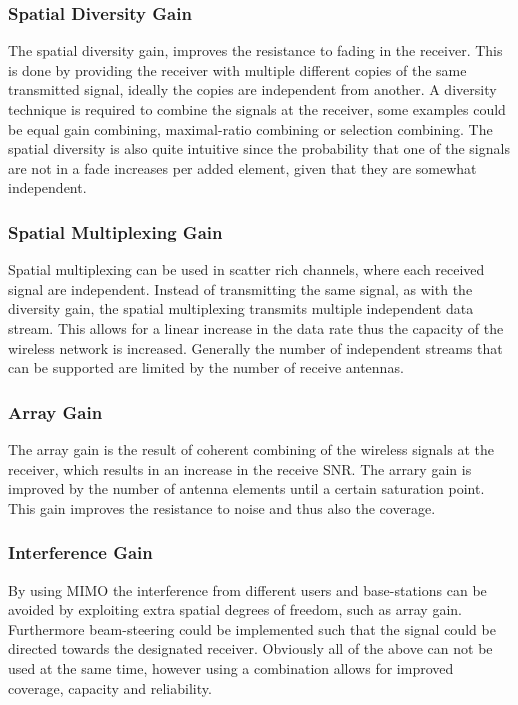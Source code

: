 \subsubsection{Spatial Diversity Gain}
The spatial diversity gain, improves the resistance to fading in the receiver. This is done by providing the receiver with multiple different copies of the same transmitted signal, ideally the copies are independent from another. A diversity technique is required to combine the signals at the receiver\cite{Ezio2007MIMO}, some examples could be equal gain combining, maximal-ratio combining or selection combining. The spatial diversity is also quite intuitive since the probability that one of the signals are not in a fade increases per added element, given that they are somewhat independent. 
 
\subsubsection{Spatial Multiplexing Gain}
Spatial multiplexing can be used in scatter rich channels, where each received signal are independent. Instead of transmitting the same signal, as with the diversity gain, the spatial multiplexing transmits multiple independent data stream. This allows for a linear increase in the data rate thus the capacity of the wireless network is increased. Generally the number of independent streams that can be supported are limited by the number of receive antennas. \cite{}

\subsubsection{Array Gain}
The array gain is the result of coherent combining of the wireless signals at the receiver, which results in an increase in the receive SNR. The arrary gain is improved by the number of antenna elements until a certain saturation point. This gain improves the resistance to noise and thus also the coverage. \cite{} 
  
\subsubsection{Interference Gain}
By using MIMO the interference from different users and base-stations can be avoided by exploiting extra spatial degrees of freedom, such as array gain. Furthermore beam-steering could be implemented such that the signal could be directed towards the designated receiver. Obviously all of the above can not be used at the same time, however using a combination  allows for improved coverage, capacity and reliability. \cite{}
 
